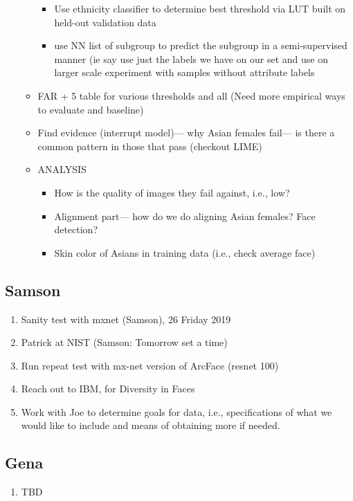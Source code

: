 \begin{enumerate}
\begin{itemize}
\begin{itemize}
            \item Use ethnicity classifier to determine best threshold via LUT built on held-out validation data
            \item use NN list of subgroup to predict the subgroup in a semi-supervised manner (ie say use just the labels we have on our set and use on larger scale experiment with samples without attribute labels
        \end{itemize}
        \item FAR + 5 table for various thresholds and all (Need more empirical ways to evaluate and baseline) 
        \item Find evidence (interrupt model)— why Asian females fail— is there a common pattern in those that pass (checkout LIME)
    \item ANALYSIS
    \begin{itemize}
        \item How is the quality of images they fail against, i.e., low?
        \item  Alignment part— how do we do aligning Asian females? Face detection?
        \item Skin color of Asians in training data (i.e., check average face)

    \end{itemize}
    \end{itemize}
\end{enumerate}
\subsection{Samson}
\begin{enumerate}
    \item Sanity test with mxnet (Samson),  26 Friday 2019
    \item Patrick at NIST (Samson: Tomorrow set a time)
    \item Run repeat test with mx-net version of ArcFace (resnet 100)
    \item Reach out to IBM, for Diversity in Faces
    \item Work with Joe to determine goals for data, i.e., specifications of what we would like to include and means of obtaining more if needed.
\end{enumerate}
\subsection{Gena}
\begin{enumerate}
    \item TBD
\end{enumerate}




